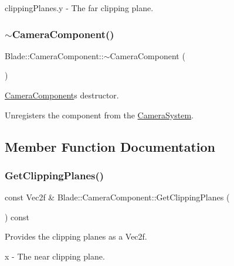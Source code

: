clipping\+Planes.\+y -\/ The far clipping plane. \mbox{\label{class_blade_1_1_camera_component_ab0efd673adcb54e7464accfbe80bb612}} 
\subsubsection{\texorpdfstring{$\sim$\+Camera\+Component()}{~CameraComponent()}}
{\footnotesize\ttfamily Blade\+::\+Camera\+Component\+::$\sim$\+Camera\+Component (\begin{DoxyParamCaption}{ }\end{DoxyParamCaption})}



\hyperlink{class_blade_1_1_camera_component}{Camera\+Component}\textquotesingle{}s destructor. 

Unregisters the component from the \hyperlink{class_blade_1_1_camera_system}{Camera\+System}. 

\subsection{Member Function Documentation}
\mbox{\label{class_blade_1_1_camera_component_a2eac5f51fbae88dd50ee1077777088c3}} 
\subsubsection{\texorpdfstring{Get\+Clipping\+Planes()}{GetClippingPlanes()}}
{\footnotesize\ttfamily const Vec2f \& Blade\+::\+Camera\+Component\+::\+Get\+Clipping\+Planes (\begin{DoxyParamCaption}{ }\end{DoxyParamCaption}) const\hspace{0.3cm}{\ttfamily [noexcept]}}



Provides the clipping planes as a Vec2f. 

x -\/ The near clipping plane.

